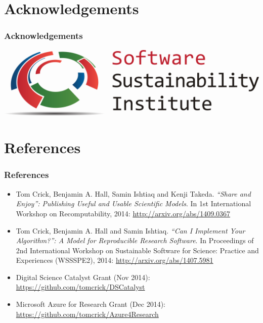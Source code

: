 \documentclass[pdftex]{beamer}
\begin{document}
\section{Acknowledgements}

\begin{frame}
\frametitle{Acknowledgements}
\begin{center}
\includegraphics[width=0.9\paperwidth]{ssi.png}
\end{center}
\end{frame}


\section{References}

\begin{frame}
\frametitle{References}
{\small{\begin{itemize}
\item Tom Crick, Benjamin A. Hall, Samin Ishtiaq and Kenji
  Takeda. {\emph{``Share and Enjoy'': Publishing Useful and Usable
      Scientific Models}}. In 1st International Workshop on
  Recomputability, 2014: \url{http://arxiv.org/abs/1409.0367}
\item Tom Crick, Benjamin A. Hall and Samin Ishtiaq. {\emph{``Can I Implement
  Your Algorithm?'': A Model for Reproducible Research Software}}. In
  Proceedings of 2nd International Workshop on Sustainable Software
  for Science: Practice and Experiences (WSSSPE2), 2014:
  \url{http://arxiv.org/abs/1407.5981}
\item Digital Science Catalyst Grant (Nov 2014):
  \url{https://github.com/tomcrick/DSCatalyst} 
\item Microsoft Azure for Research Grant (Dec 2014):
  \url{https://github.com/tomcrick/Azure4Research} 
\end{itemize}}}
\end{frame}
\end{document}
